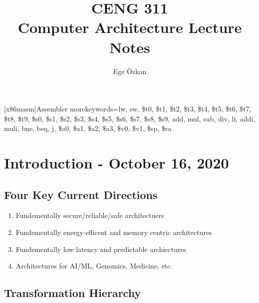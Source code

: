 \documentclass[11pt,a4paper,twocolumn]{book}
\author{Ege Özkan}
\title{CENG 311 \\ \large{Computer Architecture Lecture Notes}}
\begin{document}
\newcommand{\code}[1]{\texttt{#1}}
\newcommand{\cputime}{\ensuremath{\text{CPU Time}}}
\newcommand{\cyclecount}{\text{Cycle Count}}
\newcommand{\cycletime}{\text{Cycle Time}}
\newcommand{\clockrate}{\text{Clock Rate}}

\newcommand{\C}[1]{\code{#1}}

\newcommand{\rs}[1]{\code{\$s#1}} %
\newcommand{\rt}[1]{\code{\$t#1}} %
\newcommand{\Rs}[1]{\code{\$s#1}}
\newcommand{\Rt}[1]{\code{\$t#1}}
\newcommand{\Ra}[1]{\code{\$a#1}}
\newcommand{\Rv}[1]{\code{\$v#1}}
\newcommand{\Rra}{\code{\$ra}}
\newcommand{\Rsp}{\code{\$sp}}
\maketitle
\newcommand{\inscount}{\text{IC}}
\newcommand{\missed}{\textit{!*}}
   [x86masm]{Assembler} %
   {morekeywords={lw, sw, \$t0, \$t1,
   \$t2, \$t3, \$t4, \$t5, \$t6, \$t7,
   \$t8, \$t9, \$s0, \$s1, \$s2, \$s3,
   \$s4, \$s5, \$s6, \$s7, \$s8, \$s9,
   add, mul, sub, div,
   li, addi, muli, bne, beq, j,
   \$a0, \$a1, \$a2, \$a3, \$v0, \$v1,
   \$sp, \$ra}} %


\lstset{language=[MISP]Assembler}

\chapter{Introduction - October 16, 2020}

\section{Four Key Current Directions}

\begin{enumerate}
\item Fundementally secure/reliable/safe architectuers
\item Fundementally energy-efficent and memory centric architectures
\item Fundementally low latency and predictable archiectures
\item Architectures for AI/ML, Genomics, Medicine, etc.
\end{enumerate}

\section{Transformation Hierarchy}
\end{document}
